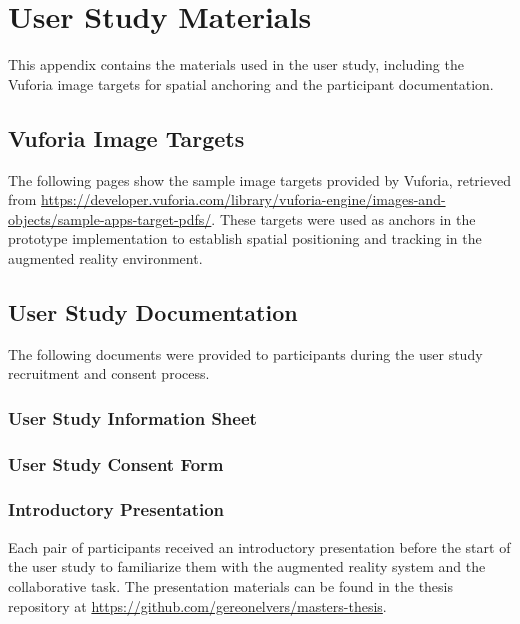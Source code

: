 \chapter{User Study Materials}
\label{appendix:anchors}

This appendix contains the materials used in the user study, including the Vuforia image targets for spatial anchoring and the participant documentation.

\section{Vuforia Image Targets}

The following pages show the sample image targets provided by Vuforia, retrieved from \url{https://developer.vuforia.com/library/vuforia-engine/images-and-objects/sample-apps-target-pdfs/}. These targets were used as anchors in the prototype implementation to establish spatial positioning and tracking in the augmented reality environment.



\section{User Study Documentation}

The following documents were provided to participants during the user study recruitment and consent process.

\subsection{User Study Information Sheet}



\subsection{User Study Consent Form}



\subsection{Introductory Presentation}

Each pair of participants received an introductory presentation before the start of the user study to familiarize them with the augmented reality system and the collaborative task. The presentation materials can be found in the thesis repository at \url{https://github.com/gereonelvers/masters-thesis}. 